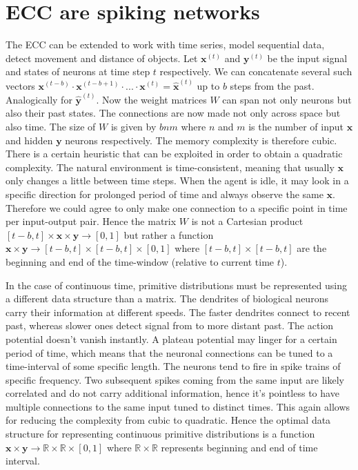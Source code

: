 \documentclass[12pt]{article}
\begin{document}
\section{ECC are spiking networks}

The ECC can be extended to work with time series, model sequential data, detect movement and distance of objects. Let $\boldsymbol{x}^{(t)}$ and $\boldsymbol{y}^{(t)}$ be the input signal and states of neurons at time step $t$ respectively. We can concatenate several such vectors $\boldsymbol{x}^{(t-b)}\cdot \boldsymbol{x}^{(t-b+1) }\cdot ...\cdot\boldsymbol{x}^{(t)}=\boldsymbol{\hat{x}}^{(t)}$ up to $b$ steps from the past. Analogically for $\boldsymbol{\hat{y}}^{(t)}$. Now the weight matrices $W$ can span not only neurons but also their past states. The connections are now made not only across space but also time. The size of $W$ is given by $bnm$ where $n$ and $m$ is the number of input $\boldsymbol{x}$ and hidden $\boldsymbol{y}$ neurons respectively. The memory complexity is therefore cubic. There is a certain heuristic that can be exploited in order to obtain a quadratic complexity. The natural environment is time-consistent, meaning that usually $\boldsymbol{x}$ only changes a little between time steps. When the agent is idle, it may look in a specific direction for prolonged period of time and always observe the same $\boldsymbol{x}$. Therefore we could agree to only make one connection to a specific point in time per input-output pair. Hence the matrix $W$ is not a Cartesian product $[t-b,t] \times \boldsymbol{x} \times \boldsymbol{y} \rightarrow [0,1]$  but rather a function $\boldsymbol{x} \times \boldsymbol{y} \rightarrow [t-b,t] \times [t-b,t] \times [0,1]$ where $[t-b,t] \times [t-b,t]$ are the beginning and end of the time-window (relative to current time $t$).

In the case of continuous time, primitive distributions must be represented using a different data structure than a matrix. The dendrites of biological neurons carry their information at different speeds. The faster dendrites connect to recent past, whereas slower ones detect signal from to more distant past. The action potential doesn't vanish instantly. A plateau potential may linger for a certain period of time, which means that the neuronal connections can be tuned to a time-interval of some specific length. The neurons tend to fire in spike trains of specific frequency. Two subsequent spikes coming from the same input are likely correlated and do not carry additional information, hence it's pointless to have multiple connections to the same input tuned to distinct times. This again allows for reducing the complexity from cubic to quadratic. Hence the optimal data structure for representing continuous primitive distributions is a function $\boldsymbol{x} \times \boldsymbol{y} \rightarrow \mathbb{R} \times \mathbb{R} \times [0,1]$ where $\mathbb{R} \times \mathbb{R}$ represents beginning and end of time interval.
\end{document}
